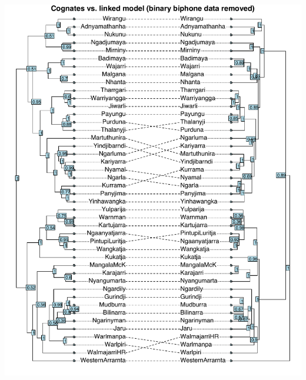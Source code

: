 \documentclass[]{article}
\begin{document}
\includegraphics{fig/cogs_vs_linked.pdf}

\printbibliography
\end{document}
